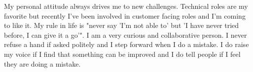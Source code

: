 \documentclass[8pt]{developercv} %
\begin{document}
\vspace{0.5cm}



\begin{minipage}[t]{0.4\textwidth} %
	\vspace{-\baselineskip} %
	
	My personal attitude always drives me to new challenges.
    Technical roles are my favorite but recently I've been involved in customer facing roles and I'm coming to like it.
    My rule in life is "never say 'I'm not able to' but 'I have never tried before, I can give it a go'".
    I am a very curious and collaborative person.
    I never refuse a hand if asked politely and I step forward when I do a mistake.
    I do raise my voice if I find that something can be improved and I do tell people if I feel they are doing a mistake.\\ %
\end{minipage}
\hfill %
\begin{minipage}[t]{0.5\textwidth} %
	\vspace{-\baselineskip} %
	\begin{barchart}{5.5}
	\end{barchart}
\end{minipage}

\begin{center}
\end{center}


\end{document}
